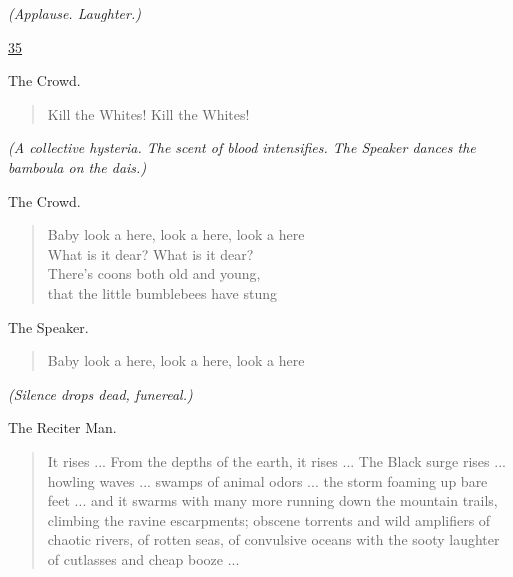 \documentclass[letterpaper,article,12pt,oneside,notitlepage]{memoir}
\begin{document}
\textit{(Applause. Laughter.)}

\clearpage

\href{http://cesaire.elotroalex.com/chiens/chiens/p035.html}{35}

\begin{center}The Crowd.\end{center}

\begin{verse}
\hspace{1cm} Kill the Whites! Kill the Whites! \\
\end{verse}

\textit{(A collective hysteria. The scent of blood intensifies. The Speaker dances the bamboula on the dais.)}

\begin{center}The Crowd.\end{center}

\begin{verse}
\hspace{1cm} Baby look a here, look a here, look a here \\
\hspace{1cm} What is it dear? What is it dear? \\
\hspace{1cm} There's coons both old and young, \\
\hspace{1cm} that the little bumblebees have stung \\
\end{verse}

\begin{center}The Speaker.\end{center}

\begin{verse}
\hspace{1cm} Baby look a here, look a here, look a here \\
\end{verse}

\textit{(Silence drops dead, funereal.)}

\begin{center}The Reciter Man.\end{center}

\begin{verse}
\indent It rises ... From the depths of the earth, it rises ... The Black surge rises ... howling waves ... swamps of animal odors ... the storm foaming up bare feet ... and it swarms with many more running down the mountain trails, climbing the ravine escarpments; obscene torrents and wild amplifiers of chaotic rivers, of rotten seas, of convulsive oceans with the sooty laughter of cutlasses and cheap booze ... \\
\end{verse}
\end{document}
